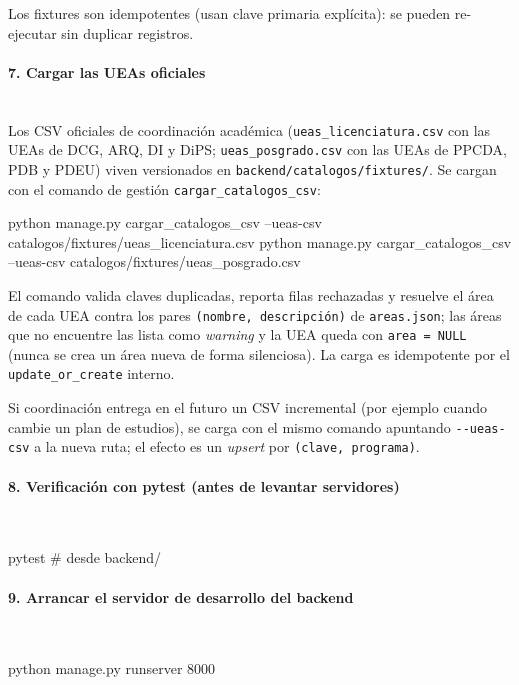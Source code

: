 Los fixtures son idempotentes (usan clave primaria explícita): se pueden re-ejecutar sin duplicar registros.

\paragraph{7. Cargar las UEAs oficiales}\mbox{}\\
Los CSV oficiales de coordinación académica (\texttt{ueas\_licenciatura.csv} con las UEAs de DCG, ARQ, DI y DiPS; \texttt{ueas\_posgrado.csv} con las UEAs de PPCDA, PDB y PDEU) viven versionados en \texttt{backend/catalogos/fixtures/}. Se cargan con el comando de gestión \texttt{cargar\_catalogos\_csv}:

\begin{Comandos}
python manage.py cargar_catalogos_csv --ueas-csv catalogos/fixtures/ueas_licenciatura.csv
python manage.py cargar_catalogos_csv --ueas-csv catalogos/fixtures/ueas_posgrado.csv
\end{Comandos}

El comando valida claves duplicadas, reporta filas rechazadas y resuelve el área de cada UEA contra los pares \texttt{(nombre, descripción)} de \texttt{areas.json}; las áreas que no encuentre las lista como \emph{warning} y la UEA queda con \texttt{area = NULL} (nunca se crea un área nueva de forma silenciosa). La carga es idempotente por el \texttt{update\_or\_create} interno.

Si coordinación entrega en el futuro un CSV incremental (por ejemplo cuando cambie un plan de estudios), se carga con el mismo comando apuntando \texttt{-{}-ueas-csv} a la nueva ruta; el efecto es un \emph{upsert} por \texttt{(clave, programa)}.

\paragraph{8. Verificación con pytest (antes de levantar servidores)}\mbox{}\\
\begin{Comandos}
pytest    # desde backend/
\end{Comandos}

\paragraph{9. Arrancar el servidor de desarrollo del backend}\mbox{}\\
\begin{Comandos}
python manage.py runserver 8000
\end{Comandos}

